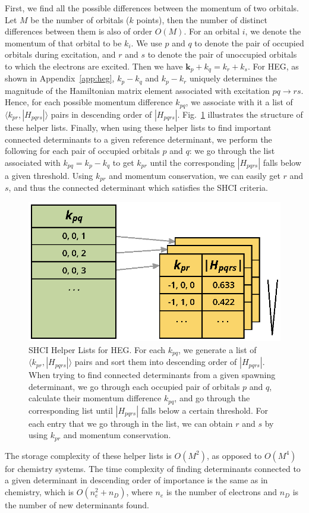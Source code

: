 First, we find all the possible differences between the momentum of two orbitals.
Let $M$ be the number of orbitals ($k$ points), then the number of distinct differences between them is also of order $O(M)$.
For an orbital $i$, we denote the momentum of that orbital to be $k_{i}$.
We use $p$ and $q$ to denote the pair of occupied orbitals during excitation, and $r$ and $s$ to denote the pair of unoccupied orbitals to which the electrons are excited.
Then we have $\mathbf{k}_p + k_q = k_r + k_s$.
For HEG, as shown in Appendix~\ref{app:heg}, $k_p - k_q$ and $k_p - k_r$ uniquely determines the magnitude of the Hamiltonian matrix element associated with excitation $pq\to rs$.
Hence, for each possible momentum difference $k_{pq}$, we associate with it a list of $\langle k_{pr}, |H_{pqrs}|\rangle$ pairs in descending order of $|H_{pqrs}|$.
Fig.~\ref{fig:helper} illustrates the structure of these helper lists.
Finally, when using these helper lists to find important connected determinants to a given reference determinant, we perform the following for each pair of occupied orbitals $p$ and $q$: we go through the list associated with $k_{pq} = k_p - k_q$ to get $k_{pr}$ until the corresponding $|H_{pqrs}|$ falls below a given threshold.
Using $k_{pr}$ and momentum conservation, we can easily get $r$ and $s$, and thus the connected determinant which satisfies the SHCI criteria.
\begin{figure}
  \begin{center}
  \includegraphics[width=0.9\linewidth]{figs/HelperList.eps}
  \end{center}
  \vspace{-0.2cm}
  \caption{SHCI Helper Lists for HEG.
  For each $k_{pq}$, we generate a list of $\langle k_{pr}, |H_{pqrs}|\rangle$ pairs and sort them into descending order of $|H_{pqrs}|$.
  When trying to find connected determinants from a given spawning determinant, we go through each occupied pair of orbitals $p$ and $q$, calculate their momentum difference $k_{pq}$, and go through the corresponding list until $|H_{pqrs}|$ falls below a certain threshold.
  For each entry that we go through in the list, we can obtain $r$ and $s$ by using $k_{pr}$ and momentum conservation.
  }
  \label{fig:helper}
\end{figure}

The storage complexity of these helper lists is $O(M^2)$, as opposed to $O(M^4)$ for chemistry systems.
The time complexity of finding determinants connected to a given determinant in descending order of importance is the same as in chemistry, which is $O(n_e^2 + n_D)$, where $n_e$ is the number of electrons and $n_D$ is the number of new determinants found.
